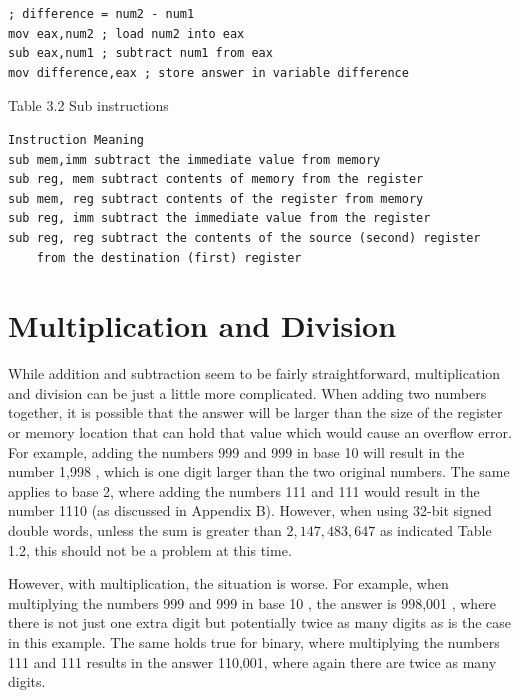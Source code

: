 \documentclass[10pt]{book}
\begin{document}
\begin{verbatim}
; difference = num2 - num1
mov eax,num2 ; load num2 into eax
sub eax,num1 ; subtract num1 from eax
mov difference,eax ; store answer in variable difference
\end{verbatim}

Table 3.2 Sub instructions

\begin{verbatim}
Instruction Meaning
sub mem,imm subtract the immediate value from memory
sub reg, mem subtract contents of memory from the register
sub mem, reg subtract contents of the register from memory
sub reg, imm subtract the immediate value from the register
sub reg, reg subtract the contents of the source (second) register
    from the destination (first) register
\end{verbatim}

\section{Multiplication and Division}
While addition and subtraction seem to be fairly straightforward, multiplication and division can be just a little more complicated. When adding two numbers together, it is possible that the answer will be larger than the size of the register or memory location that can hold that value which would cause an overflow error. For example, adding the numbers 999 and 999 in base 10 will result in the number 1,998 , which is one digit larger than the two original numbers. The same applies to base 2, where adding the numbers 111 and 111 would result in the number 1110 (as discussed in Appendix B). However, when using 32-bit signed double words, unless the sum is greater than $2,147,483,647$ as indicated Table 1.2, this should not be a problem at this time.

However, with multiplication, the situation is worse. For example, when multiplying the numbers 999 and 999 in base 10 , the answer is 998,001 , where there is not just one extra digit but potentially twice as many digits as is the case in this example. The same holds true for binary, where multiplying the numbers 111 and 111 results in the answer 110,001, where again there are twice as many digits.
\end{document}
